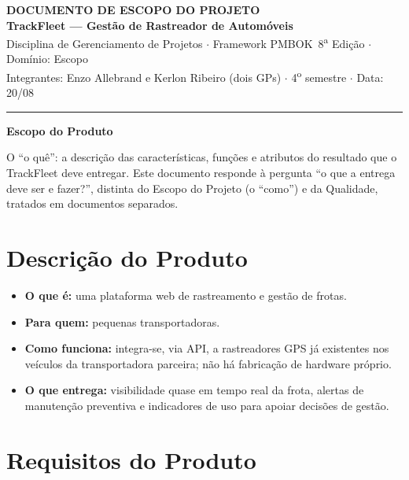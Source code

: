 \documentclass[11pt,a4paper]{article}
\begin{document}
\begin{center}
{\Large\bfseries DOCUMENTO DE ESCOPO DO PROJETO}\\[2pt]
{\large\bfseries TrackFleet --- Gestão de Rastreador de Automóveis}\\[4pt]
Disciplina de Gerenciamento de Projetos $\cdot$ Framework PMBOK\textregistered\ 8\textsuperscript{a} Edição $\cdot$ Domínio: Escopo\\[2pt]
Integrantes: Enzo Allebrand e Kerlon Ribeiro (dois GPs) $\cdot$ 4\textsuperscript{o} semestre $\cdot$ Data: 20/08
\end{center}

\vspace{2mm}
\hrule
\vspace{4mm}

\noindent\textbf{\large Escopo do Produto}

\vspace{1mm}
\noindent O ``o quê'': a descrição das características, funções e atributos do resultado que o TrackFleet deve entregar. Este documento responde à pergunta ``o que a entrega deve ser e fazer?'', distinta do Escopo do Projeto (o ``como'') e da Qualidade, tratados em documentos separados.

\section{Descrição do Produto}
\begin{itemize}[itemsep=3pt]
  \item \textbf{O que é:} uma plataforma web de rastreamento e gestão de frotas.
  \item \textbf{Para quem:} pequenas transportadoras.
  \item \textbf{Como funciona:} integra-se, via API, a rastreadores GPS já existentes nos veículos da transportadora parceira; não há fabricação de hardware próprio.
  \item \textbf{O que entrega:} visibilidade quase em tempo real da frota, alertas de manutenção preventiva e indicadores de uso para apoiar decisões de gestão.
\end{itemize}

\section{Requisitos do Produto}
\end{document}
